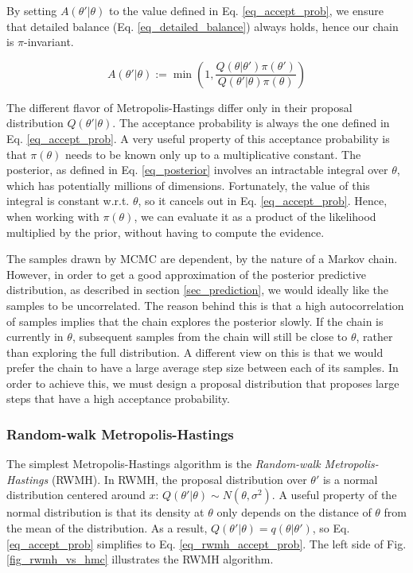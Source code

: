 \documentclass[12pt]{article}
\begin{document}
{By setting $A(\theta'|\theta)$ to the value defined in Eq. \ref{eq_accept_prob}, we ensure that detailed balance (Eq. \ref{eq_detailed_balance}) always holds, hence our chain is $\pi$-invariant. 

\begin{equation}
A(\theta'|\theta) := \min \left(1, \frac{Q(\theta|\theta')\pi(\theta')}{Q(\theta'|\theta)\pi(\theta)} \right)
\label{eq_accept_prob}
\end{equation}

The different flavor of Metropolis-Hastings differ only in their proposal distribution $Q(\theta'|\theta)$. The acceptance probability is always the one defined in Eq. \ref{eq_accept_prob}. A very useful property of this acceptance probability is that $\pi(\theta)$ needs to be known only up to a multiplicative constant. The posterior, as defined in Eq. \ref{eq_posterior} involves an intractable integral over $\theta$, which has potentially millions of dimensions. Fortunately, the value of this integral is constant w.r.t. $\theta$, so it cancels out in Eq. \ref{eq_accept_prob}. Hence, when working with $\pi(\theta)$, we can evaluate it as a product of the likelihood multiplied by the prior, without having to compute the evidence.

The samples drawn by MCMC are dependent, by the nature of a Markov chain. However, in order to get a good approximation of the posterior predictive distribution, as described in section \ref{sec_prediction}, we would ideally like the samples to be uncorrelated. The reason behind this is that a high autocorrelation of samples implies that the chain explores the posterior slowly. If the chain is currently in $\theta$, subsequent samples from the chain will still be close to $\theta$, rather than exploring the full distribution. A different view on this is that we would prefer the chain to have a large average step size between each of its samples. In order to achieve this, we must design a proposal distribution that proposes large steps that have a high acceptance probability.

\subsubsection{Random-walk Metropolis-Hastings}

The simplest Metropolis-Hastings algorithm is the \textit{Random-walk Metropolis-Hastings} (RWMH). In RWMH, the proposal distribution over $\theta'$ is a normal distribution centered around $x$: $Q(\theta'|\theta) \sim N(\theta, \sigma^2)$. A useful property of the normal distribution is that its density at $\theta$ only depends on the distance of $\theta$ from the mean of the distribution. As a result, $Q(\theta'|\theta) = q(\theta|\theta')$, so Eq. \ref{eq_accept_prob} simplifies to Eq. \ref{eq_rwmh_accept_prob}. The left side of Fig. \ref{fig_rwmh_vs_hmc} illustrates the RWMH algorithm.

}
\end{document}
